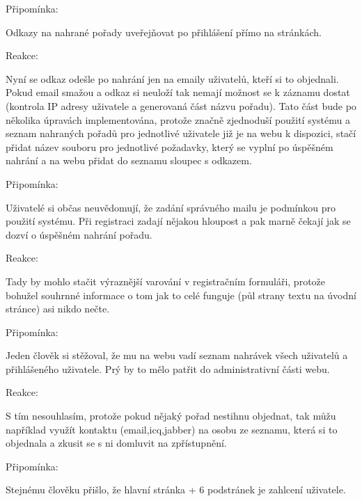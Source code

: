 \begin{bf}Připomínka:\end{bf} Odkazy na nahrané pořady uveřejňovat po přihlášení přímo na stránkách. 

\begin{bf}Reakce:\end{bf} Nyní se odkaz odešle po nahrání jen na emaily uživatelů, kteří si to objednali. Pokud email smažou a odkaz si neuloží tak nemají možnost se k záznamu dostat (kontrola IP adresy uživatele a generovaná část názvu pořadu). Tato část bude po několika úpravách implementována, protože značně zjednoduší použití systému a seznam nahraných pořadů pro jednotlivé uživatele již je na webu k dispozici, stačí přidat název souboru pro jednotlivé požadavky, který se vyplní po úspěšném nahrání a na webu přidat do seznamu sloupec s odkazem.

\vspace{10pt}

\begin{bf}Připomínka:\end{bf} Uživatelé si občas neuvědomují, že zadání správného mailu je podmínkou pro použití systému. Při registraci zadají nějakou hloupost a pak marně čekají jak se dozví o úspěšném nahrání pořadu.

\begin{bf}Reakce:\end{bf} Tady by mohlo stačit výraznější varování v registračním formuláři, protože bohužel souhrnné informace o tom jak to celé funguje (půl strany textu na úvodní stránce) asi nikdo nečte.

\vspace{10pt}

\begin{bf}Připomínka:\end{bf} Jeden člověk si stěžoval, že mu na webu vadí seznam nahrávek všech uživatelů a přihlášeného uživatele. Prý by to mělo patřit do administrativní části webu.

\begin{bf}Reakce:\end{bf} S tím nesouhlasím, protože pokud nějaký pořad nestihnu objednat, tak můžu například využít kontaktu (email,icq,jabber) na osobu ze seznamu, která si to objednala a zkusit se s ni domluvit na zpřístupnění.

\vspace{10pt}

\begin{bf}Připomínka:\end{bf} Stejnému člověku přišlo, že hlavní stránka + 6 podstránek je zahlcení uživatele. 

